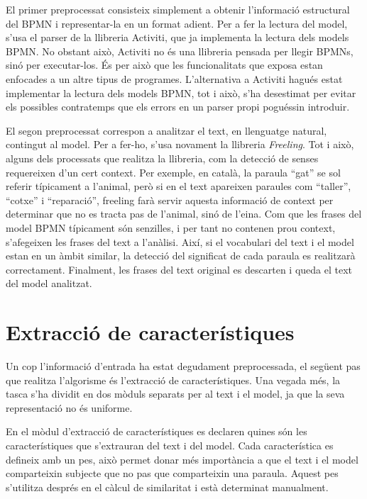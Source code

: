 El primer preprocessat consisteix simplement a obtenir l'informació estructural del BPMN i representar-la en un format adient. Per a fer la lectura del model, s'usa el parser de la llibreria Activiti, que ja implementa la lectura dels models BPMN. No obstant això, Activiti no és una llibreria pensada per llegir BPMNs, sinó per executar-los. És per això que les funcionalitats que exposa estan enfocades a un altre tipus de programes. L'alternativa a Activiti hagués estat implementar la lectura dels models BPMN, tot i això, s'ha desestimat per evitar els possibles contratemps que els errors en un parser propi poguéssin introduir.

El segon preprocessat correspon a analitzar el text, en llenguatge natural, contingut al model. Per a fer-ho, s'usa novament la llibreria \emph{Freeling}. Tot i això, alguns dels processats que realitza la llibreria, com la detecció de senses requereixen d'un cert context. Per exemple, en català, la paraula ``gat'' se sol referir típicament a l'animal, però si en el text apareixen paraules com ``taller'', ``cotxe'' i ``reparació'', freeling farà servir aquesta informació de context per determinar que no es tracta pas de l'animal, sinó de l'eina. Com que les frases del model BPMN típicament són senzilles, i per tant no contenen prou context, s'afegeixen les frases del text a l'anàlisi. Així, si el vocabulari del text i el model estan en un àmbit similar, la detecció del significat de cada paraula es realitzarà correctament. Finalment, les frases del text original es descarten i queda el text del model analitzat. 

\section{Extracció de característiques}
\label{sec:implementacio-extraccio}

Un cop l'informació d'entrada ha estat degudament preprocessada, el següent pas que realitza l'algorisme és l'extracció de característiques. Una vegada més, la tasca s'ha dividit en dos mòduls separats per al text i el model, ja que la seva representació no és uniforme. 

En el mòdul d'extracció de característiques es declaren quines són les característiques que s'extrauran del text i del model. Cada característica es defineix amb un pes, això permet donar més importància a que el text i el model comparteixin subjecte que no pas que comparteixin una paraula. Aquest pes s'utilitza després en el càlcul de similaritat i està determinat manualment.


